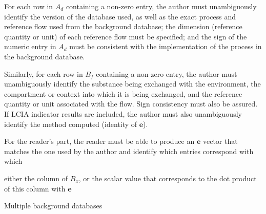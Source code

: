 
For each row in $A_d$ containing a non-zero entry, the author must unambiguously identify the version of the database used, as well as the exact process and reference flow used from the background database; the dimension (reference quantity or unit) of each reference flow must be specified; and the sign of the numeric entry in $A_d$ must be consistent with the implementation of the process in the background database.  


Similarly, for each row in $B_f$ containing a non-zero entry, the author must unambiguously identify the substance being exchanged with the environment, the compartment or context into which it is being exchanged, and the reference quantity or unit associated with the flow.  Sign consistency must also be assured.  If LCIA indicator results are included, the author must also unambiguously identify the method computed (identity of $\mathbf{e}$).  

For the reader's part, the reader must be able to produce an $\mathbf{e}$ vector that matches the one used by the author and identify which entries correspond with which 

either the column of $B_x$, or the scalar value that corresponds to the dot product of this column with $\mathbf{e}$


Multiple background databases

